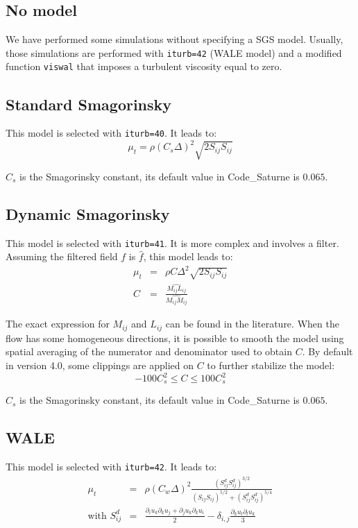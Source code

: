 \documentclass[a4paper]{article}
\newcommand{\CS}{%
   {\fontfamily{ppl}\fontshape{it}\selectfont Code\_Saturne}\xspace}
\begin{document}
\subsection{No model}
We have performed some simulations without specifying a SGS model. Usually, those simulations are performed with \verb!iturb=42! (WALE model) and a modified function \verb!viswal! that imposes a turbulent viscosity equal to zero.

\subsection{Standard Smagorinsky}
This model is selected with \verb!iturb=40!. It leads to:
$$\mu_t = \rho \left( C_s \Delta \right)^2 \sqrt{2 S_{ij} S_{ij}}$$

$C_s$ is the Smagorinsky constant, its default value in \CS is $0.065$.

\subsection{Dynamic Smagorinsky}
This model is selected with \verb!iturb=41!. It is more complex and involves a filter. Assuming the filtered field $f$ is $\widehat{f}$, this model leads to:
\begin{eqnarray}
\mu_t & = & \rho C \Delta^2 \sqrt{2 S_{ij} S_{ij}} \nonumber \\
C & = & \frac{\widehat{M_{ij} L_{ij}}}{\widehat{M_{ij} M_{ij}}}
\end{eqnarray}

The exact expression for $M_{ij}$ and $L_{ij}$ can be found in the literature. When the flow has some homogeneous directions, it is possible to smooth the model using spatial averaging of the numerator and denominator used to obtain $C$. By default in version 4.0, some clippings are applied on $C$ to further stabilize the model:
$$-100 C_s^2 \leq C \leq 100 C_s^2$$

$C_s$ is the Smagorinsky constant, its default value in \CS is $0.065$.

\subsection{WALE}
This model is selected with \verb!iturb=42!. It leads to:
\begin{eqnarray}
\mu_t & = & \rho \left( C_w \Delta \right)^2 \frac{ \left( S^d_{ij} S^d_{ij} \right)^{3/2} }{ \left( S_{ij} S_{ij} \right)^{5/2} + \left( S^d_{ij} S^d_{ij} \right)^{5/4} } \nonumber \\
\mbox{with } S^d_{ij} & = & \frac{\partial_i u_k \partial_k u_j + \partial_j u_k \partial_k u_i}{2} - \delta_{i,j} \frac{\partial_k u_l \partial_l u_k}{3}
\end{eqnarray}
\end{document}
